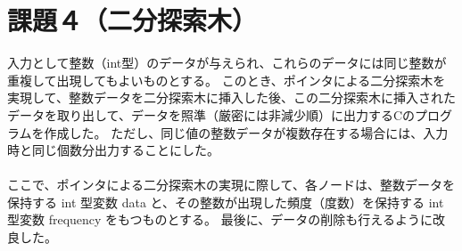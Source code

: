 \documentclass[]{jsarticle}
\begin{document}
\section*{課題４（二分探索木）}
入力として整数（int型）のデータが与えられ、これらのデータには同じ整数が重複して出現してもよいものとする。
このとき、ポインタによる二分探索木を実現して、整数データを二分探索木に挿入した後、この二分探索木に挿入されたデータを取り出して、データを照準（厳密には非減少順）に出力するCのプログラムを作成した。
ただし、同じ値の整数データが複数存在する場合には、入力時と同じ個数分出力することにした。\\
\\ここで、ポインタによる二分探索木の実現に際して、各ノードは、整数データを保持する int 型変数 data と、その整数が出現した頻度（度数）を保持する int 型変数 frequency をもつものとする。
最後に、データの削除も行えるように改良した。\\
\end{document}
